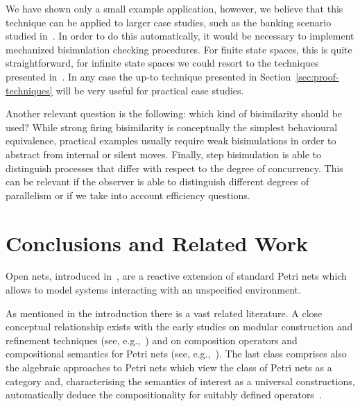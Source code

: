\documentclass{LMCS}
\begin{document}
We have shown only a small example application, however, we believe
that this technique can be applied to larger case studies, such as the
banking scenario studied in~\cite{bbcg:web-services-equ}. In order to do this
automatically, it would be necessary to implement mechanized
bisimulation checking procedures. For finite state spaces, this is
quite straightforward, for infinite state spaces we could resort to
the techniques presented in~\cite{h:proving-up-to}. In any case the
up-to technique presented in Section~\ref{sec:proof-techniques} will
be very useful for practical case studies.

Another relevant question is the following: which kind of 
bisimilarity should be used? While strong firing bisimilarity
is conceptually the simplest behavioural equivalence, practical examples
usually require weak bisimulations in order to abstract from internal
or silent
moves. Finally, step bisimulation is able to distinguish processes
that differ with respect to the degree of concurrency. This can be
relevant if the observer is able to distinguish different degrees of
parallelism or if we take into account efficiency questions.

\section{Conclusions and Related Work}
\label{se:conclusion}

Open nets, introduced in~\cite{BCEH:CMRS,BCEH:CSOP}, are
a reactive extension of standard Petri nets which allows to model
systems interacting with an unspecified environment. 

As mentioned in the introduction there is a vast related literature. A
close conceptual relationship exists with the early studies on modular
construction and refinement techniques (see,
e.g.,~\cite{v:petri-stepwise-refine,SM83,Mul85,Vog87}) and on
composition operators and compositional semantics for Petri
nets (see, e.g.,~\cite{And83,Ber87,Bau88,Vos87}).
The last class comprises also the algebraic approaches to Petri nets
which view the class of Petri nets as a category and, characterising
the semantics of interest as a universal constructions, automatically
deduce the compositionality for suitably defined
operators~\cite{Win:ES,Win:PNAM,MM:PNM}.
\end{document}
